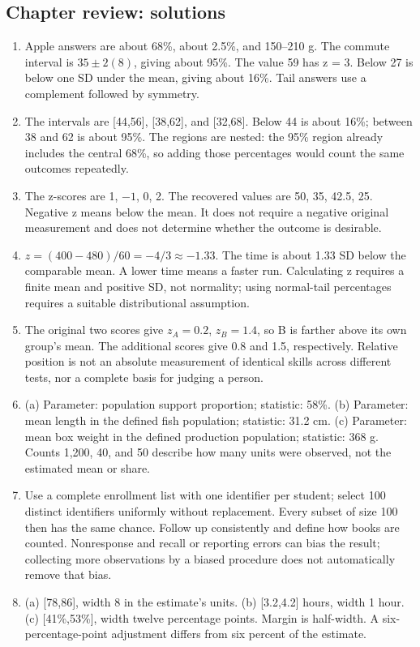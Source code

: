 \documentclass[11pt,letterpaper]{article}
\begin{document}
{\subsection*{Chapter review: solutions}
\begin{enumerate}
\item Apple answers are about 68\%, about 2.5\%, and 150--210 g. The commute interval is $35\pm2(8)$, giving about 95\%. The value 59 has z = 3. Below 27 is below one SD under the mean, giving about 16\%. Tail answers use a complement followed by symmetry.
\item The intervals are [44,56], [38,62], and [32,68]. Below 44 is about 16\%; between 38 and 62 is about 95\%. The regions are nested: the 95\% region already includes the central 68\%, so adding those percentages would count the same outcomes repeatedly.
\item The z-scores are 1, $-1$, 0, 2. The recovered values are 50, 35, 42.5, 25. Negative z means below the mean. It does not require a negative original measurement and does not determine whether the outcome is desirable.
\item $z=(400-480)/60=-4/3\approx-1.33$. The time is about 1.33 SD below the comparable mean. A lower time means a faster run. Calculating z requires a finite mean and positive SD, not normality; using normal-tail percentages requires a suitable distributional assumption.
\item The original two scores give $z_A=0.2$, $z_B=1.4$, so B is farther above its own group's mean. The additional scores give 0.8 and 1.5, respectively. Relative position is not an absolute measurement of identical skills across different tests, nor a complete basis for judging a person.
\item (a) Parameter: population support proportion; statistic: 58\%. (b) Parameter: mean length in the defined fish population; statistic: 31.2 cm. (c) Parameter: mean box weight in the defined production population; statistic: 368 g. Counts 1,200, 40, and 50 describe how many units were observed, not the estimated mean or share.
\item Use a complete enrollment list with one identifier per student; select 100 distinct identifiers uniformly without replacement. Every subset of size 100 then has the same chance. Follow up consistently and define how books are counted. Nonresponse and recall or reporting errors can bias the result; collecting more observations by a biased procedure does not automatically remove that bias.
\item (a) [78,86], width 8 in the estimate's units. (b) [3.2,4.2] hours, width 1 hour. (c) [41\%,53\%], width twelve percentage points. Margin is half-width. A six-percentage-point adjustment differs from six percent of the estimate.

\end{enumerate}}
\end{document}

